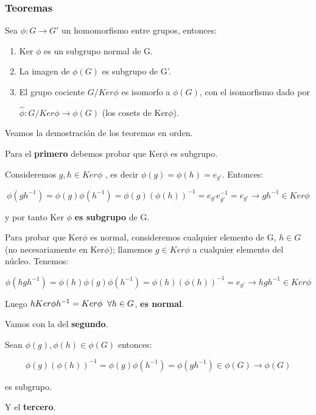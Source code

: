 \subsubsection{Teoremas}

Sea $\phi : G\rightarrow G'$ un homomorfismo entre grupos, entonces:

\begin{enumerate}
\item Ker $\phi$ es un subgrupo normal de G.

\item La imagen de $\phi (G)$ es subgrupo de G'.

\item El grupo cociente $G/Ker\phi$ es isomorfo a $\phi (G)$, con el isomorfismo dado por

$\hat{\phi} : G/Ker\phi \rightarrow \phi (G)$ (los cosets de Ker$\phi$).

\end{enumerate}

Veamos la demostración de los teoremas en orden.

\bigskip
Para el \textbf{primero} debemos probar que Ker$\phi$ es subgrupo.

\smallskip
Consideremos $g,h\in Ker\phi $ , es decir $\phi (g) =\phi (h)=e_{g'}$. Entonces:

$$\phi (gh^{-1})=\phi (g)\phi (h^{-1})=\phi (g)(\phi(h))^{-1}=e_{g'}e_{g'}^{-1}=e_{g'} \rightarrow gh^{-1} \in Ker \phi $$

y por tanto Ker $\phi$ \textbf{es subgrupo} de G.
\smallskip

Para probar que Ker$\phi$ es normal, consideremos cualquier elemento de G, $h\in G$ (no necesariamente en Ker$\phi$); llamemos $g\in Ker \phi$ a cualquier elemento del núcleo. Tenemos:

$$\phi (hgh^{-1})=\phi(h)\phi (g)\phi (h^{-1})=\phi(h)(\phi(h))^{-1}=e_{g'}\rightarrow hgh^{-1}\in Ker\phi$$


Luego $hKer\phi h^{-1}=Ker \phi \hspace{0.2cm} \forall h\in G$, \textbf{es normal}.

\bigskip
Vamos con la del \textbf{segundo}.
\smallskip

Sean $\phi (g),\phi (h)\in  \phi(G)$ entonces:

$$\phi (g)(\phi(h))^{-1}=\phi (g)\phi (h^{-1})=\phi (gh^{-1})\in \phi (G)\rightarrow \phi (G)$$

es subgrupo.

\bigskip
Y el \textbf{tercero}.

